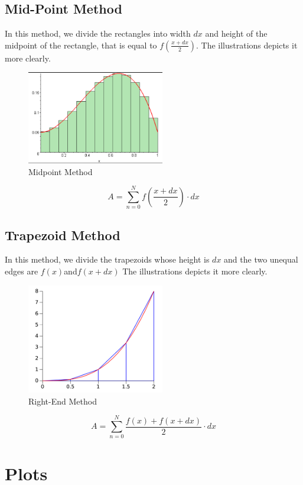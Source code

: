 \documentclass[12pt]{article}
\begin{document}
\subsection{Mid-Point Method}
In this method, we divide the rectangles into width $dx$ and height of the midpoint of the rectangle, that is equal to $f(\frac{x+dx}{2})$.
The illustrations depicts it more clearly.
\begin{figure}[H]
    \centering
    \includegraphics[width=6cm]{mids.png}
    \caption{Midpoint Method}
    \label{fig:mids}
\end{figure}
\begin{equation}
    A=\sum_{n=0}^N f(\frac{x+dx}{2})\cdot dx
\end{equation}


\subsection{Trapezoid Method}
In this method, we divide the trapezoids whose height is $dx$ and the two unequal edges are $f(x)$and$f(x+dx)$
The illustrations depicts it more clearly.
\begin{figure}[H]
    \centering
    \includegraphics[width=6cm]{traps.png}
    \caption{Right-End Method}
    \label{fig:traps}
\end{figure}
\begin{equation}
    A=\sum_{n=0}^N \frac{f(x)+f(x+dx)}{2} \cdot dx
\end{equation}


\section{Plots}
\end{document}
